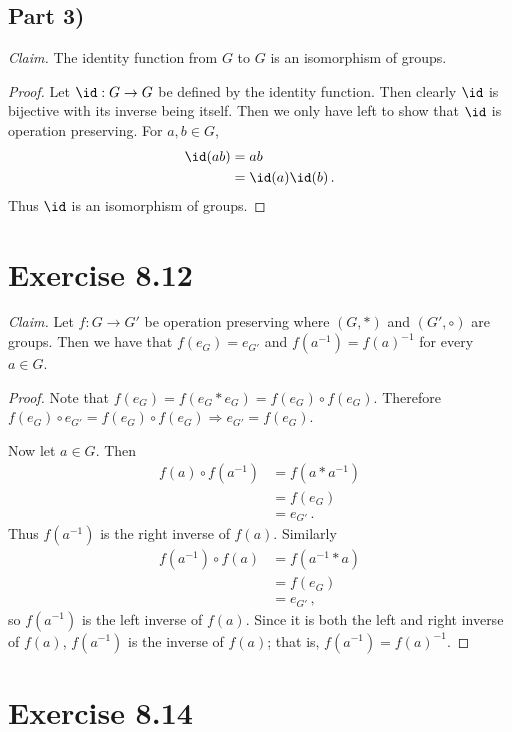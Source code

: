 \documentclass{abrice}
\newcommand{\Claim}{\emph{Claim.}\xspace}%
\begin{document}
\subsection{Part 3)}

\Claim The identity function from $G$ to $G$ is an isomorphism of groups.

\begin{proof}
  Let $\id : G \to G$ be defined by the identity function. Then clearly $\id$ is
  bijective with its inverse being itself. Then we only have left to show that $\id$ is
  operation preserving. For $a,b \in G$,
  \begin{align*}
    \id(ab)
    &= ab \\
    &= \id(a) \id(b)\, .
  \end{align*}
  Thus $\id$ is an isomorphism of groups.
\end{proof}

\section{Exercise 8.12}

\Claim Let $f : G \to G'$ be operation preserving where $(G,*)$ and $(G',
\circ)$ are groups. Then we have that $f(e_G) = e_{G'}$ and $f(a^{-1}) =
{f(a)}^{-1}$ for every $a \in G$.

\begin{proof}
  Note that $f(e_G) = f(e_G * e_G) = f(e_G) \circ f(e_G)$. Therefore $f(e_G)
  \circ e_{G'} = f(e_G) \circ f(e_G) \Rightarrow e_{G'} = f(e_G)$.

  Now let $a \in G$. Then
  \begin{align*}
    f(a) \circ f(a^{-1})
    &= f(a * a^{-1}) \\
    &= f(e_G) \\
    &= e_{G'}\, .
  \end{align*}
  Thus $f(a^{-1})$ is the right inverse of $f(a)$. Similarly
  \begin{align*}
    f(a^{-1}) \circ f(a)
    &= f(a^{-1} * a) \\
    &= f(e_G) \\
    &= e_{G'}\, ,
  \end{align*}
  so $f(a^{-1})$ is the left inverse of $f(a)$. Since it is both the left and
  right inverse of $f(a)$, $f(a^{-1})$ is the inverse of $f(a)$; that is,
  $f(a^{-1}) = {f(a)}^{-1}$.
\end{proof}

\section{Exercise 8.14}
\end{document}
